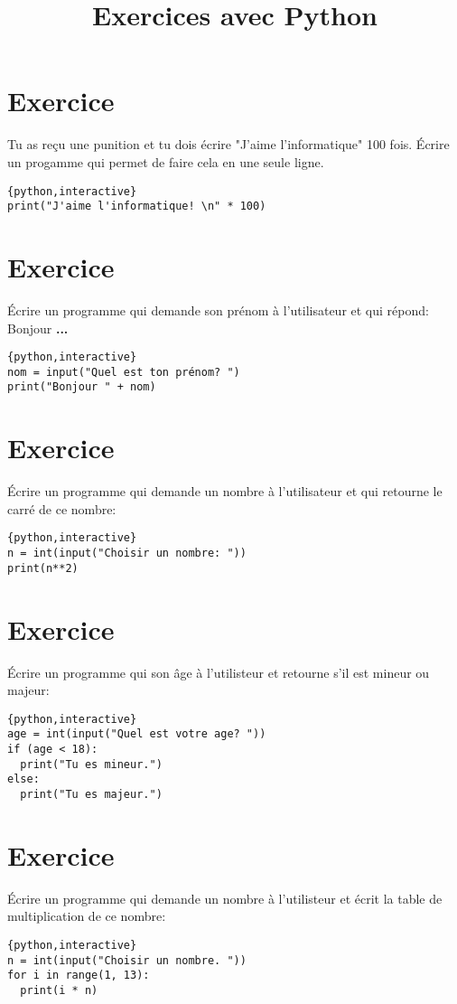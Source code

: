 \documentclass[a4paper,11pt]{article}
\begin{document}
\title{Exercices avec Python}
\date{}
\maketitle

\section{Exercice}
Tu as reçu une punition et tu dois écrire "J'aime l'informatique" 100 fois.
Écrire un progamme qui permet de faire cela en une seule ligne.
\begin{solution}
\begin{verbatim}{python,interactive}
print("J'aime l'informatique! \n" * 100)
\end{verbatim}
\end{solution}


\section{Exercice}
Écrire un programme qui demande son prénom à l'utilisateur et qui répond:\\
Bonjour \textbf{...}\\
\begin{solution}
\begin{verbatim}{python,interactive}
nom = input("Quel est ton prénom? ")
print("Bonjour " + nom)
\end{verbatim}
\end{solution}

\section{Exercice}
Écrire un programme qui demande un nombre à l'utilisateur et qui retourne le carré de ce nombre:\\
\begin{solution}
\begin{verbatim}{python,interactive}
n = int(input("Choisir un nombre: "))
print(n**2)
\end{verbatim}
\end{solution}

\section{Exercice}
Écrire un programme qui son âge à l'utilisteur et retourne s'il est mineur ou majeur:\\
\begin{solution}
\begin{verbatim}{python,interactive}
age = int(input("Quel est votre age? "))
if (age < 18):
  print("Tu es mineur.")
else:
  print("Tu es majeur.")
\end{verbatim}
\end{solution}

\section{Exercice}
Écrire un programme qui demande un nombre à l'utilisteur et écrit la table de multiplication de ce nombre:\\
\begin{solution}
\begin{verbatim}{python,interactive}
n = int(input("Choisir un nombre. "))
for i in range(1, 13):
  print(i * n)
\end{verbatim}
\end{solution}
\end{document}
